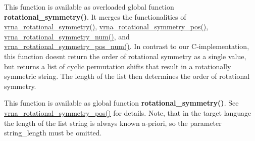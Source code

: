 \begin{DoxyRefList}
 This function is available as overloaded global function {\bfseries{rotational\+\_\+symmetry()}}. It merges the functionalities of \mbox{\hyperlink{group__combinatorics__utils_gae1dec02c4b63f303ce06a9293d316762}{vrna\+\_\+rotational\+\_\+symmetry()}}, \mbox{\hyperlink{group__combinatorics__utils_ga294d48935fcac87ab335d771fe289ecb}{vrna\+\_\+rotational\+\_\+symmetry\+\_\+pos()}}, \mbox{\hyperlink{group__combinatorics__utils_gac51464b5281833a58c25f9447252c495}{vrna\+\_\+rotational\+\_\+symmetry\+\_\+num()}}, and \mbox{\hyperlink{group__combinatorics__utils_ga95b5a6ac35da982e2a766f8d2f98a2e1}{vrna\+\_\+rotational\+\_\+symmetry\+\_\+pos\+\_\+num()}}. In contrast to our C-\/implementation, this function doesn\textquotesingle{}t return the order of rotational symmetry as a single value, but returns a list of cyclic permutation shifts that result in a rotationally symmetric string. The length of the list then determines the order of rotational symmetry.  
\item[Global \mbox{\hyperlink{group__combinatorics__utils_ga95b5a6ac35da982e2a766f8d2f98a2e1}{vrna\+\_\+rotational\+\_\+symmetry\+\_\+pos\+\_\+num}} (const unsigned int $\ast$string, size\+\_\+t string\+\_\+length, unsigned int $\ast$$\ast$positions)]\label{wrappers__wrappers000017}%
%
 This function is available as global function {\bfseries{rotational\+\_\+symmetry()}}. See \mbox{\hyperlink{group__combinatorics__utils_ga294d48935fcac87ab335d771fe289ecb}{vrna\+\_\+rotational\+\_\+symmetry\+\_\+pos()}} for details. Note, that in the target language the length of the list {\ttfamily string} is always known a-\/priori, so the parameter {\ttfamily string\+\_\+length} must be omitted.  
\item[Global \mbox{\hyperlink{group__soft__constraints_gaf162aedac7422f2eb16ea030f47d2f4b}{vrna\+\_\+sc\+\_\+add\+\_\+bp}} (vrna\+\_\+fold\+\_\+compound\+\_\+t $\ast$vc, int i, int j, F\+L\+T\+\_\+\+O\+R\+\_\+\+D\+BL energy, unsigned int options)]\label{wrappers__wrappers000036}%
%
 


\end{DoxyRefList}
